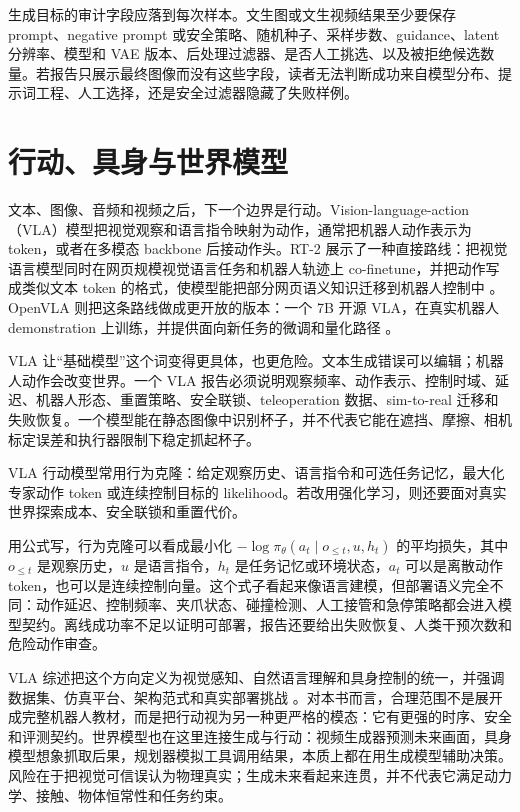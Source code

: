 \documentclass[UTF8,zihao=-4,openany]{ctexbook}
\begin{document}
生成目标的审计字段应落到每次样本。文生图或文生视频结果至少要保存 prompt、negative prompt 或安全策略、随机种子、采样步数、guidance、latent 分辨率、模型和 VAE 版本、后处理过滤器、是否人工挑选、以及被拒绝候选数量。若报告只展示最终图像而没有这些字段，读者无法判断成功来自模型分布、提示词工程、人工选择，还是安全过滤器隐藏了失败样例。

\section{行动、具身与世界模型}
文本、图像、音频和视频之后，下一个边界是行动。Vision-language-action（VLA）模型把视觉观察和语言指令映射为动作，通常把机器人动作表示为 token，或者在多模态 backbone 后接动作头。RT-2 展示了一种直接路线：把视觉语言模型同时在网页规模视觉语言任务和机器人轨迹上 co-finetune，并把动作写成类似文本 token 的格式，使模型能把部分网页语义知识迁移到机器人控制中 \cite{brohan2023rt2}。 OpenVLA 则把这条路线做成更开放的版本：一个 7B 开源 VLA，在真实机器人 demonstration 上训练，并提供面向新任务的微调和量化路径 \cite{kim2024openvla}。

VLA 让“基础模型”这个词变得更具体，也更危险。文本生成错误可以编辑；机器人动作会改变世界。一个 VLA 报告必须说明观察频率、动作表示、控制时域、延迟、机器人形态、重置策略、安全联锁、teleoperation 数据、sim-to-real 迁移和失败恢复。一个模型能在静态图像中识别杯子，并不代表它能在遮挡、摩擦、相机标定误差和执行器限制下稳定抓起杯子。

VLA 行动模型常用行为克隆：给定观察历史、语言指令和可选任务记忆，最大化专家动作 token 或连续控制目标的 likelihood。若改用强化学习，则还要面对真实世界探索成本、安全联锁和重置代价。

用公式写，行为克隆可以看成最小化 $-\log \pi_\theta(a_t\mid o_{\le t},u,h_t)$ 的平均损失，其中 $o_{\le t}$ 是观察历史，$u$ 是语言指令，$h_t$ 是任务记忆或环境状态，$a_t$ 可以是离散动作 token，也可以是连续控制向量。这个式子看起来像语言建模，但部署语义完全不同：动作延迟、控制频率、夹爪状态、碰撞检测、人工接管和急停策略都会进入模型契约。离线成功率不足以证明可部署，报告还要给出失败恢复、人类干预次数和危险动作审查。

VLA 综述把这个方向定义为视觉感知、自然语言理解和具身控制的统一，并强调数据集、仿真平台、架构范式和真实部署挑战 \cite{uddin2025vlasurvey}。对本书而言，合理范围不是展开成完整机器人教材，而是把行动视为另一种更严格的模态：它有更强的时序、安全和评测契约。世界模型也在这里连接生成与行动：视频生成器预测未来画面，具身模型想象抓取后果，规划器模拟工具调用结果，本质上都在用生成模型辅助决策。风险在于把视觉可信误认为物理真实；生成未来看起来连贯，并不代表它满足动力学、接触、物体恒常性和任务约束。
\end{document}
